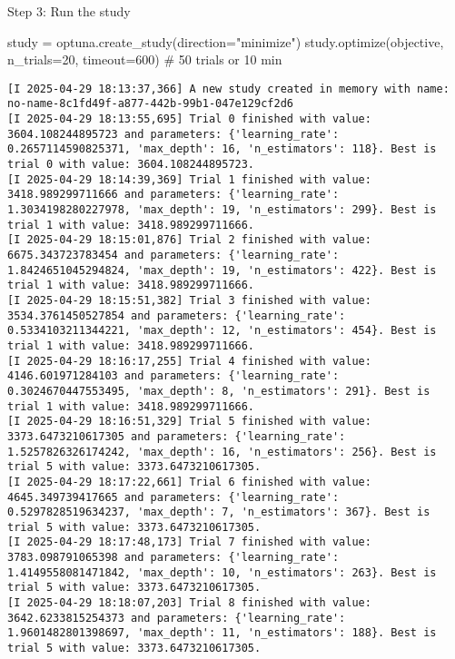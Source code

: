 \documentclass[
  letterpaper,
  DIV=11,
  numbers=noendperiod]{scrreprt}
\newenvironment{Shaded}{\begin{snugshade}}{\end{snugshade}}
\newcommand{\CommentTok}[1]{\textcolor[rgb]{0.37,0.37,0.37}{#1}}
\newcommand{\DecValTok}[1]{\textcolor[rgb]{0.68,0.00,0.00}{#1}}
\newcommand{\NormalTok}[1]{\textcolor[rgb]{0.00,0.23,0.31}{#1}}
\newcommand{\OperatorTok}[1]{\textcolor[rgb]{0.37,0.37,0.37}{#1}}
\newcommand{\StringTok}[1]{\textcolor[rgb]{0.13,0.47,0.30}{#1}}
\begin{document}
Step 3: Run the study

\begin{Shaded}
\begin{Highlighting}[]
\NormalTok{study }\OperatorTok{=}\NormalTok{ optuna.create\_study(direction}\OperatorTok{=}\StringTok{"minimize"}\NormalTok{)}
\NormalTok{study.optimize(objective, n\_trials}\OperatorTok{=}\DecValTok{20}\NormalTok{, timeout}\OperatorTok{=}\DecValTok{600}\NormalTok{)  }\CommentTok{\# 50 trials or 10 min}
\end{Highlighting}
\end{Shaded}

\begin{verbatim}
[I 2025-04-29 18:13:37,366] A new study created in memory with name: no-name-8c1fd49f-a877-442b-99b1-047e129cf2d6
[I 2025-04-29 18:13:55,695] Trial 0 finished with value: 3604.108244895723 and parameters: {'learning_rate': 0.2657114590825371, 'max_depth': 16, 'n_estimators': 118}. Best is trial 0 with value: 3604.108244895723.
[I 2025-04-29 18:14:39,369] Trial 1 finished with value: 3418.989299711666 and parameters: {'learning_rate': 1.3034198280227978, 'max_depth': 19, 'n_estimators': 299}. Best is trial 1 with value: 3418.989299711666.
[I 2025-04-29 18:15:01,876] Trial 2 finished with value: 6675.343723783454 and parameters: {'learning_rate': 1.8424651045294824, 'max_depth': 19, 'n_estimators': 422}. Best is trial 1 with value: 3418.989299711666.
[I 2025-04-29 18:15:51,382] Trial 3 finished with value: 3534.3761450527854 and parameters: {'learning_rate': 0.5334103211344221, 'max_depth': 12, 'n_estimators': 454}. Best is trial 1 with value: 3418.989299711666.
[I 2025-04-29 18:16:17,255] Trial 4 finished with value: 4146.601971284103 and parameters: {'learning_rate': 0.3024670447553495, 'max_depth': 8, 'n_estimators': 291}. Best is trial 1 with value: 3418.989299711666.
[I 2025-04-29 18:16:51,329] Trial 5 finished with value: 3373.6473210617305 and parameters: {'learning_rate': 1.5257826326174242, 'max_depth': 16, 'n_estimators': 256}. Best is trial 5 with value: 3373.6473210617305.
[I 2025-04-29 18:17:22,661] Trial 6 finished with value: 4645.349739417665 and parameters: {'learning_rate': 0.5297828519634237, 'max_depth': 7, 'n_estimators': 367}. Best is trial 5 with value: 3373.6473210617305.
[I 2025-04-29 18:17:48,173] Trial 7 finished with value: 3783.098791065398 and parameters: {'learning_rate': 1.4149558081471842, 'max_depth': 10, 'n_estimators': 263}. Best is trial 5 with value: 3373.6473210617305.
[I 2025-04-29 18:18:07,203] Trial 8 finished with value: 3642.6233815254373 and parameters: {'learning_rate': 1.9601482801398697, 'max_depth': 11, 'n_estimators': 188}. Best is trial 5 with value: 3373.6473210617305.

\end{verbatim}
\end{document}
